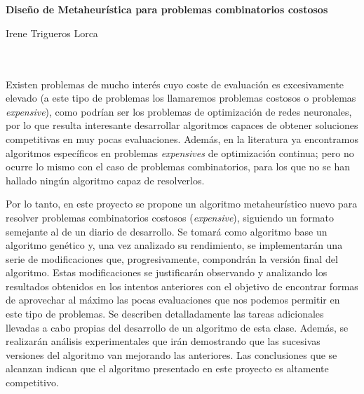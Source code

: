 \chapter*{}






\cleardoublepage
\thispagestyle{empty}

\begin{center}
{\large\bfseries Diseño de Metaheurística para problemas combinatorios costosos}\\
\end{center}
\begin{center}
Irene Trigueros Lorca\\
\end{center}

\\

\vspace{0.7cm}
\\

Existen problemas de mucho interés cuyo coste de evaluación es excesivamente elevado (a este tipo de problemas los llamaremos problemas costosos o problemas \textit{expensive}), como podrían ser los problemas de optimización de redes neuronales, por lo que resulta interesante desarrollar algoritmos capaces de obtener soluciones competitivas en muy pocas evaluaciones. 
Además, en la literatura ya encontramos algoritmos específicos en problemas \textit{expensives} de optimización continua; pero no ocurre lo mismo con el caso de problemas combinatorios, para los que no se han hallado ningún algoritmo capaz de resolverlos.

Por lo tanto, en este proyecto se propone un algoritmo metaheurístico nuevo para resolver problemas combinatorios costosos (\textit{expensive}), siguiendo un formato semejante al de un diario de desarrollo. 
Se tomará como algoritmo base un algoritmo genético y, una vez analizado su rendimiento, se implementarán una serie de modificaciones que, progresivamente, compondrán la versión final del algoritmo. 
Estas modificaciones se justificarán observando y analizando los resultados obtenidos en los intentos anteriores con el objetivo de encontrar formas de aprovechar al máximo las pocas evaluaciones que nos podemos permitir en este tipo de problemas. 
Se describen detalladamente las tareas adicionales llevadas a cabo propias del desarrollo de un algoritmo de esta clase. 
Además, se realizarán análisis experimentales que irán demostrando que las sucesivas versiones del algoritmo van mejorando las anteriores.
Las conclusiones que se alcanzan indican que el algoritmo presentado en este proyecto es altamente competitivo. 



